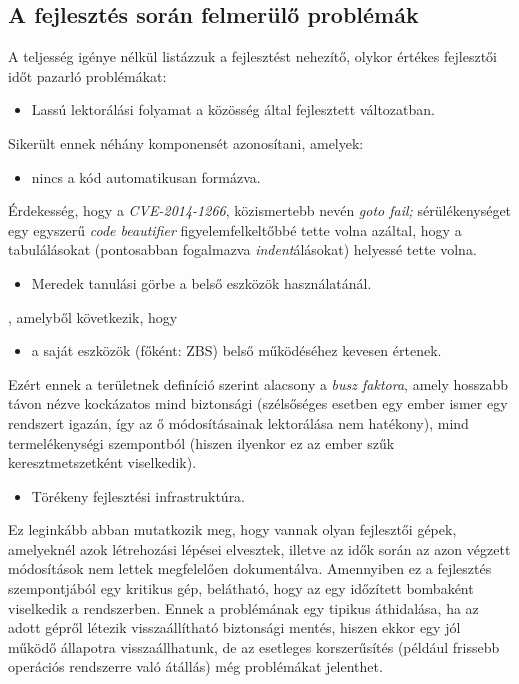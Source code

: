 \subsection{A fejlesztés során felmerülő problémák}

A teljesség igénye nélkül listázzuk a fejlesztést nehezítő, olykor értékes fejlesztői időt pazarló
problémákat:
\begin{itemize}
    \item Lassú lektorálási folyamat a közösség által fejlesztett változatban.
\end{itemize}
Sikerült ennek néhány komponensét azonosítani, amelyek:

\begin{itemize}
    \item nincs a kód automatikusan formázva.
\end{itemize}
Érdekesség, hogy a \emph{CVE-2014-1266}\cite{cve20141266}, közismertebb nevén \emph{goto fail;} sérülékenységet egy
egyszerű \emph{code beautifier} figyelemfelkeltőbbé tette volna azáltal, hogy a tabulálásokat
(pontosabban fogalmazva \emph{indent}álásokat) helyessé tette volna.

\begin{itemize}
    \item Meredek tanulási görbe a belső eszközök használatánál.
\end{itemize}
, amelyből következik, hogy
\begin{itemize}
    \item a saját eszközök (főként: ZBS) belső működéséhez kevesen értenek.
\end{itemize}
Ezért ennek a területnek definíció szerint alacsony a \emph{busz faktora}, amely hosszabb távon
nézve kockázatos mind biztonsági (szélsőséges esetben egy ember ismer egy rendszert igazán, így az
ő módosításainak lektorálása nem hatékony), mind termelékenységi szempontból (hiszen ilyenkor
ez az ember szűk keresztmetszetként viselkedik).

\begin{itemize}
    \item Törékeny fejlesztési infrastruktúra.
\end{itemize}
Ez leginkább abban mutatkozik meg, hogy vannak olyan fejlesztői gépek, amelyeknél azok létrehozási
lépései elvesztek, illetve az idők során az azon végzett módosítások nem lettek megfelelően
dokumentálva. Amennyiben ez a fejlesztés szempontjából egy kritikus gép, belátható, hogy az egy
időzített bombaként viselkedik a rendszerben. Ennek a problémának egy tipikus áthidalása, ha az
adott gépről létezik visszaállítható biztonsági mentés, hiszen ekkor egy jól működő állapotra
visszaállhatunk, de az esetleges korszerűsítés (például frissebb operációs rendszerre való átállás)
még problémákat jelenthet.

